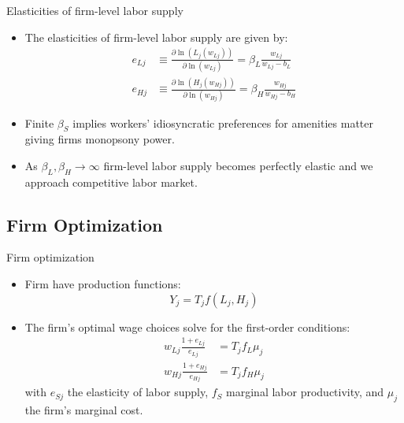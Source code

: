 \documentclass[notes=show]{beamer}
\begin{document}
\begin{frame}{Elasticities of firm-level labor supply}
\begin{itemize}
\item The elasticities of firm-level labor supply are given by:
\begin{align*}
    e_{Lj} & \equiv \frac{\partial \ln(L_{j}(w_{Lj}))}{\partial \ln(w_{Lj})} = \beta_{L} \frac{w_{Lj}}{w_{Lj} - b_{L}} \\
    e_{Hj} & \equiv \frac{\partial \ln(H_{j}(w_{Hj}))}{\partial \ln(w_{Hj})} = \beta_{H} \frac{w_{Hj}}{w_{Hj} - b_{H}}
\end{align*}
\item Finite $ \beta_{S} $ implies workers' idiosyncratic preferences for amenities matter giving firms monopsony power. \medskip
\item As $ \beta_{L}, \beta_{H} \rightarrow \infty $ firm-level labor supply becomes perfectly elastic and we approach competitive labor market.
\end{itemize}
\end{frame}

\subsection*{Firm Optimization}

\begin{frame}{Firm optimization}
\begin{itemize}
\item Firm have production functions:
\begin{equation*}
    Y_{j} = T_{j} f(L_{j},H_{j})
\end{equation*}
\item The firm's optimal wage choices solve for the first-order conditions:
\begin{align*}
    w_{Lj} \frac{1+e_{Lj}}{e_{Lj}} & = T_{j} f_{L} \mu_{j} \tag{8} \\
    w_{Hj} \frac{1+e_{Hj}}{e_{Hj}} & = T_{j} f_{H} \mu_{j} \tag{9}
\end{align*}
with $ e_{Sj} $ the elasticity of labor supply, $ f_{S} $ marginal labor productivity, and $\mu_{j} $ the firm's marginal cost.
\end{itemize}
\end{frame}
\end{document}
